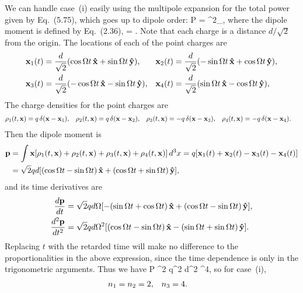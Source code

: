 \begin{solution}
	We can handle case~(i) easily using the multipole expansion for the total power given by Eq.~(5.75), which goes up to dipole order:
	\beqn \label{power}
		P =  ^2_\ret,
	\eeqn
	where the dipole moment is defined by Eq.~(2.36),
	\beqn \label{dipole}
		\vp = \int \vx \rho \dcx.
	\eeqn
	Note that each charge is a distance $d / \sqrt{2}$ from the origin.  The locations of each of the point charges are
	\begin{align}
		\vb{x}_1(t) &= \frac{d}{\sqrt{2}} (\cos \Omega t \,\vb{\hat{x}} + \sin \Omega t \,\vb{\hat{y}}), &
		\vb{x}_2(t) &= \frac{d}{\sqrt{2}} (-\sin \Omega t \,\vb{\hat{x}} + \cos \Omega t \,\vb{\hat{y}}), \notag \\
		\vb{x}_3(t) &= \frac{d}{\sqrt{2}} (-\cos \Omega t \,\vb{\hat{x}} - \sin \Omega t \,\vb{\hat{y}}), &
		\vb{x}_4(t) &= \frac{d}{\sqrt{2}} (\sin \Omega t \,\vb{\hat{x}} - \cos \Omega t \,\vb{\hat{y}}), \label{locs}
	\end{align}
	The charge densities for the point charges are
	\begin{align*}
		\rho_1(t, \vb{x}) &= q \, \delta(\vb{x} - \vb{x}_1), &
		\rho_2(t, \vb{x}) &= q \, \delta(\vb{x} - \vb{x}_2), &
		\rho_3(t, \vb{x}) &= -q \, \delta(\vb{x} - \vb{x}_3), &
		\rho_4(t, \vb{x}) &= -q \, \delta(\vb{x} - \vb{x}_4).
	\end{align*}
	Then the dipole moment is
	\begin{align*}
		\vb{p} &= \int \vb{x} [ \rho_1(t, \vb{x}) + \rho_2(t, \vb{x}) + \rho_3(t, \vb{x}) + \rho_4(t, \vb{x}) ] \dd[3]{x}
		= q [ \vb{x}_1(t) + \vb{x}_2(t) - \vb{x}_3(t) - \vb{x}_4(t) ] \\
		&= \sqrt{2} q d [ (\cos \Omega t - \sin \Omega t) \,\vb{\hat{x}} + (\cos \Omega t + \sin \Omega t) \,\vb{\hat{y}} ],
	\end{align*}
	and its time derivatives are
	\begin{align*}
		\dv{\vb{p}}{t} &= \sqrt{2} q d \Omega [ -(\sin \Omega t + \cos \Omega t) \,\vb{\hat{x}} + (\cos \Omega t - \sin \Omega t) \,\vb{\hat{y}} ], \\
		\dv[2]{\vb{p}}{t} &= \sqrt{2} q d \Omega^2 [ (\cos \Omega t - \sin \Omega t) \,\vb{\hat{x}} - (\sin \Omega t + \sin \Omega t) \,\vb{\hat{y}} ].
	\end{align*}
	Replacing $t$ with the retarded time will make no difference to the proportionalities in the above expression, since the time dependence is only in the trigonometric arguments.  Thus we have
	\beq
		P \propto {}^2
		\propto q^2 d^2 \Omg^4,
	\eeq
	so for case~(i),
	\begin{align*}
		{n_1} &= {n_2} = 2, &
		{n_3} &= 4.
	\end{align*}
	

\end{solution}
